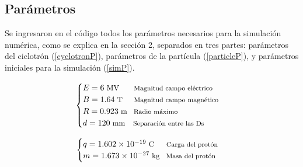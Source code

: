 \documentclass[letterpaper, 11pt]{article}
\begin{document}
\begin{multicols}{2}

\section{Parámetros}
Se ingresaron en el código todos los parámetros necesarios para la simulación numérica, como se explica en la sección 2, separados en tres partes: parámetros del ciclotrón (\ref{cyclotronP}), parámetros de la partícula (\ref{particleP}), y parámetros iniciales para la simulación (\ref{simP}).

\begin{equation}
\label{cyclotronP}
    \begin{cases}
        E = 6 \hspace{3pt} \text{\small{MV}} \hspace{18pt} \text{\footnotesize{Magnitud campo eléctrico}}\\
        B = 1.64 \hspace{3pt} \text{\small{T}} \hspace{14pt} \text{\footnotesize{Magnitud campo magnético}}\\
        R = 0.923 \hspace{3pt} \text{\small{m}} \hspace{8pt} \text{\footnotesize{Radio máximo}}\\
        d = 120 \hspace{3pt} \text{\small{mm}} \hspace{10pt} \text{\footnotesize{Separación entre las Ds}}
    \end{cases}
\end{equation}

\begin{equation}
\label{particleP}
    \begin{cases}
        q = \num{1.602e-19} \hspace{3pt} \text{\small{C}} \hspace{15pt} \text{\footnotesize{Carga del protón}}\\
        m = \num{1.673e-27} \hspace{3pt} \text{\small{kg}} \hspace{8pt} \text{\footnotesize{Masa del protón}}\\
    \end{cases}
\end{equation}


\end{multicols}
\end{document}
